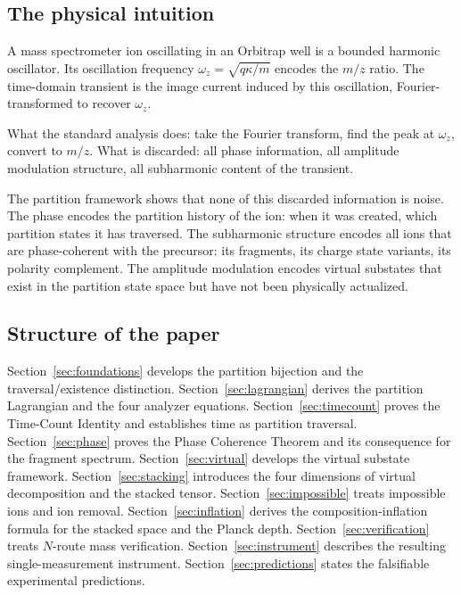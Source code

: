 \documentclass[twocolumn,10pt,a4paper]{article}
\theoremstyle{thmstyle}
\theoremstyle{definition}
\theoremstyle{remark}
\begin{document}
\subsection{The physical intuition}

A mass spectrometer ion oscillating in an Orbitrap well is a bounded
harmonic oscillator. Its oscillation frequency $\omega_z = \sqrt{q\kappa/m}$
encodes the $m/z$ ratio. The time-domain transient is the image current
induced by this oscillation, Fourier-transformed to recover $\omega_z$.

What the standard analysis does: take the Fourier transform, find the
peak at $\omega_z$, convert to $m/z$. What is discarded: all phase
information, all amplitude modulation structure, all subharmonic
content of the transient.

The partition framework shows that none of this discarded information is
noise. The phase encodes the partition history of the ion: when it was
created, which partition states it has traversed. The subharmonic
structure encodes all ions that are phase-coherent with the precursor:
its fragments, its charge state variants, its polarity complement. The
amplitude modulation encodes virtual substates that exist in the
partition state space but have not been physically actualized.

\subsection{Structure of the paper}

Section~\ref{sec:foundations} develops the partition bijection and the
traversal/existence distinction.
Section~\ref{sec:lagrangian} derives the partition Lagrangian and the four
analyzer equations.
Section~\ref{sec:timecount} proves the Time-Count Identity and establishes
time as partition traversal.
Section~\ref{sec:phase} proves the Phase Coherence Theorem and its
consequence for the fragment spectrum.
Section~\ref{sec:virtual} develops the virtual substate framework.
Section~\ref{sec:stacking} introduces the four dimensions of virtual
decomposition and the stacked tensor.
Section~\ref{sec:impossible} treats impossible ions and ion removal.
Section~\ref{sec:inflation} derives the composition-inflation formula
for the stacked space and the Planck depth.
Section~\ref{sec:verification} treats $N$-route mass verification.
Section~\ref{sec:instrument} describes the resulting single-measurement
instrument.
Section~\ref{sec:predictions} states the falsifiable experimental predictions.
\end{document}
